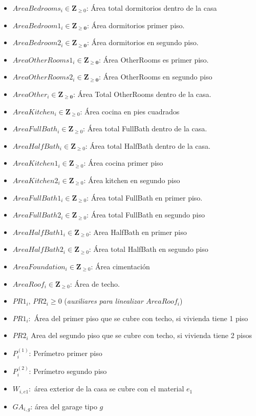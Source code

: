 \begin{itemize}
    \item $AreaBedrooms_{i} \in \mathbf{Z}_{\geq 0}$: Área total dormitorios dentro de la casa
    \item $AreaBedroom1_{i} \in \mathbf{Z_{\geq 0}}$: Área dormitorios primer piso.
    \item $AreaBedroom2_{i} \in \mathbf{Z_{\geq 0}}$: Área dormitorios en segundo piso.
    \item $AreaOtherRooms1_{i} \in \mathbf{Z_{\geq 0}}$: Área OtherRooms es primer piso.
    \item $AreaOtherRooms2_{i} \in \mathbf{Z_{\geq 0}}$: Área OtherRooms en segundo piso
    \item $AreaOther_{i}\in \mathbf{Z_{\geq 0}}$: Área Total OtherRooms dentro de la casa.
    \item $AreaKitchen_{i} \in \mathbf{Z}_{\geq 0}$: Área cocina en pies cuadrados
    \item $AreaFullBath_{i} \in \mathbf{Z}_{\geq 0}$: Área total FullBath dentro de la casa.
    \item $AreaHalfBath_{i} \in \mathbf{Z}_{\geq 0}$: Área total HalfBath dentro de la casa. 
    \item $AreaKitchen1_{i} \in \mathbf{Z}_{\geq 0}$: Área cocina primer piso
    \item $AreaKitchen2_{i}\in \mathbf{Z}_{\geq 0}$: Área kitchen en segundo piso
    \item $AreaFullBath1_{i}\in \mathbf{Z}_{\geq 0}$: Área total FullBath en primer piso.
    \item $AreaFullBath2_{i}\in \mathbf{Z}_{\geq 0}$: Área total FullBath en segundo piso
    \item $AreaHalfBath1_{i}\in \mathbf{Z}_{\geq 0}$: Area HalfBath en primer piso
    \item $AreaHalfBath2_{i}\in \mathbf{Z}_{\geq 0}$: Área total HalfBath en segundo piso
    \item $AreaFoundation_{i}\in \mathbf{Z}_{\geq 0}$: Área cimentación
    \item $AreaRoof_{i} \in \mathbf{Z}_{\geq 0}$: Área de techo.
    \item $PR1_i,\, PR2_i \ge 0$ \quad (\textit{auxiliares para linealizar $AreaRoof_i$})
    \item $PR1_{i}:$ Área del primer piso que se cubre con techo, si vivienda tiene 1 piso
    \item $PR2_{i}$ Area del segundo piso que se cubre con techo, si vivienda tiene 2 pisos
    \item $P_{i}^{(1)}$: Perímetro primer piso
    \item $P_{i}^{(2)}$: Perímetro segundo piso
    \item $W_{i,e1}:$ área exterior de la casa se cubre con el material $e_1$
    \item $GA_{i,g}$: área del garage tipo $g$
\end{itemize}
